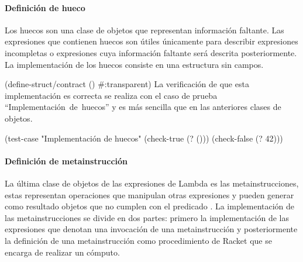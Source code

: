 \documentclass[letterpaper, twoside, openright, 11pt]{book}%
\begin{document}
\paragraph{Definición de hueco} Los huecos son una clase de objetos que representan información faltante. Las expresiones que contienen huecos son útiles únicamente para describir expresiones incompletas o expresiones cuya información faltante será descrita posteriormente. La implementación de los huecos consiste en una estructura sin campos.

\nwenddocs{}\endmoddef\nwstartdeflinemarkup{}\nwenddeflinemarkup
(define-struct/contract 
  ()
  #:transparent)
\eatline
{}\nwendcode{}\nwdocspar
La verificación de que esta implementación es correcta se realiza con el caso de prueba ``{\Tt{}Implementación\ de\ huecos\nwendquote}'' y es más sencilla que en las anteriores clases de objetos.

\nwenddocs{}\plusendmoddef\nwstartdeflinemarkup{}\nwenddeflinemarkup
(test-case "Implementación de huecos"
  (check-true (? ()))
  (check-false (? 42)))
\nwendcode{}\nwdocspar

\paragraph{Definición de metainstrucción} La última clase de objetos de las expresiones de {\Tt{}Lambda\nwendquote} es las metainstrucciones, estas representan operaciones que manipulan otras expresiones y pueden generar como resultado objetos que no cumplen con el predicado {\Tt{}\nwendquote}. La implementación de las metainstrucciones se divide en dos partes: primero la implementación de las expresiones que denotan una invocación de una metainstrucción y posteriormente la definición de una metainstrucción como procedimiento de {\Tt{}Racket\nwendquote} que se encarga de realizar un cómputo.
\end{document}
